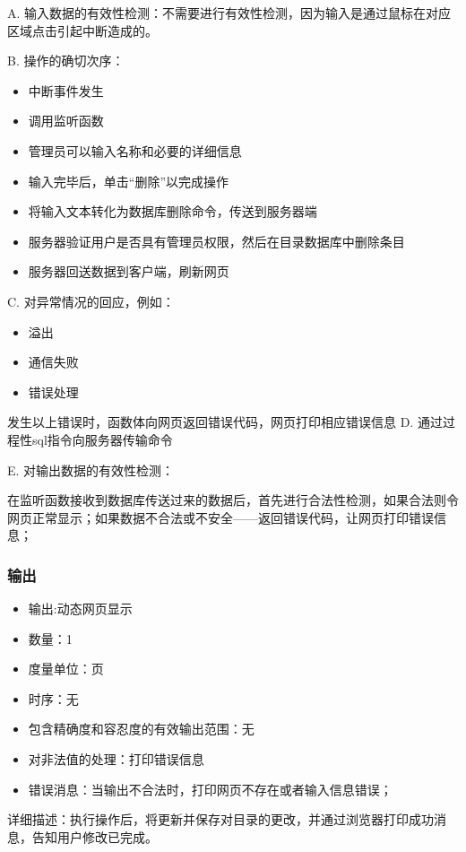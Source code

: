 	  A. 输入数据的有效性检测：不需要进行有效性检测，因为输入是通过鼠标在对应区域点击引起中断造成的。
	  
	  B. 操作的确切次序：
	  \begin{adjustwidth}{2cm}{1cm}\qquad
		  \begin{itemize}
			  \item 中断事件发生
			  \item 调用监听函数
			  \item 管理员可以输入名称和必要的详细信息
			  \item 输入完毕后，单击“删除”以完成操作
			  \item 将输入文本转化为数据库删除命令，传送到服务器端
			  \item 服务器验证用户是否具有管理员权限，然后在目录数据库中删除条目
			  \item 服务器回送数据到客户端，刷新网页
		  \end{itemize}		
	  \end{adjustwidth}
	   
	  
	  C. 对异常情况的回应，例如：
	  \begin{adjustwidth}{2cm}{1cm}\qquad
		  \begin{itemize}
			  \item 溢出
			  \item 通信失败
			  \item 错误处理
		  \end{itemize}		
	  \end{adjustwidth}
	  
		  发生以上错误时，函数体向网页返回错误代码，网页打印相应错误信息
	  D. 通过过程性sql指令向服务器传输命令
			  
	  E. 对输出数据的有效性检测：
	  
	  在监听函数接收到数据库传送过来的数据后，首先进行合法性检测，如果合法则令网页正常显示；如果数据不合法或不安全——返回错误代码，让网页打印错误信息；
	  
	  \subsubsection{输出}
	  \begin{itemize}
		  \item	输出:动态网页显示
		  \item	数量：1
		  \item	度量单位：页
		  \item	时序：无
		  \item	包含精确度和容忍度的有效输出范围：无
		  \item	对非法值的处理：打印错误信息
		  \item	错误消息：当输出不合法时，打印网页不存在或者输入信息错误；
		 \end{itemize}
		 详细描述：执行操作后，将更新并保存对目录的更改，并通过浏览器打印成功消息，告知用户修改已完成。








